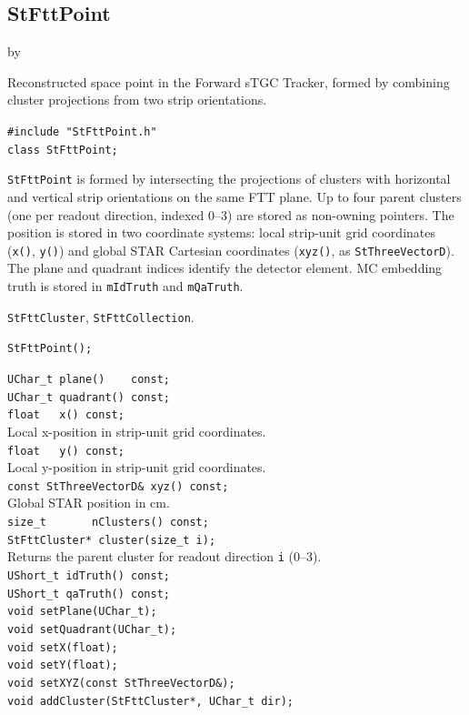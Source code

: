 \documentclass[twoside]{article}
\newcommand{\entrylabel}[1]{\mbox{\textbf{{#1}}}\hfil}%
\newenvironment{entry}
{\begin{list}{}%
    {\renewcommand{\makelabel}{\entrylabel}%
     \setlength{\labelwidth}{90pt}%
     \setlength{\leftmargin}{\labelwidth}
     \advance\leftmargin by \labelsep%
      }%
    }%
  {\end{list}}
\newcommand{\Entrylabel}[1]%
{\raisebox{0pt}[1ex][0pt]{\makebox[\labelwidth][l]%
    {\parbox[t]{\labelwidth}{\hspace{0pt}\textbf{{#1}}}}}}
\newenvironment{Entry}%
{\renewcommand{\entrylabel}{\Entrylabel}\begin{entry}}%
  {\end{entry}}
\begin{document}
\subsection{StFttPoint}
\label{sec:StFttPoint}
\begin{Entry}
\item[Summary] Reconstructed space point in the Forward sTGC Tracker, formed by combining
  cluster projections from two strip orientations.
\item[Synopsis]
    \verb+#include "StFttPoint.h"+\\
    \verb+class StFttPoint;+\\
\item[Description]
  \texttt{StFttPoint} is formed by intersecting the projections of clusters with
  horizontal and vertical strip orientations on the same FTT plane.  Up to four parent
  clusters (one per readout direction, indexed 0--3) are stored as non-owning pointers.
  The position is stored in two coordinate systems: local strip-unit grid coordinates
  (\texttt{x()}, \texttt{y()}) and global STAR Cartesian coordinates (\texttt{xyz()},
  as \texttt{StThreeVectorD}).  The plane and quadrant indices identify the detector
  element.  MC embedding truth is stored in \texttt{mIdTruth} and \texttt{mQaTruth}.
\item[Related Classes]
  \texttt{StFttCluster}, \texttt{StFttCollection}.
\item[Public\\ Constructors]
    \verb+StFttPoint();+\\
\item[Public Member\\ Functions]
    \verb+UChar_t plane()    const;+\\
    \verb+UChar_t quadrant() const;+\\
    \verb+float   x() const;+\\
    Local x-position in strip-unit grid coordinates.\\[2pt]
    \verb+float   y() const;+\\
    Local y-position in strip-unit grid coordinates.\\[2pt]
    \verb+const StThreeVectorD& xyz() const;+\\
    Global STAR position in cm.\\[2pt]
    \verb+size_t       nClusters() const;+\\
    \verb+StFttCluster* cluster(size_t i);+\\
    Returns the parent cluster for readout direction \texttt{i} (0--3).\\[2pt]
    \verb+UShort_t idTruth() const;+\\
    \verb+UShort_t qaTruth() const;+\\
    \verb+void setPlane(UChar_t);+\\
    \verb+void setQuadrant(UChar_t);+\\
    \verb+void setX(float);+\\
    \verb+void setY(float);+\\
    \verb+void setXYZ(const StThreeVectorD&);+\\
    \verb+void addCluster(StFttCluster*, UChar_t dir);+\\
\end{Entry}
\end{document}
